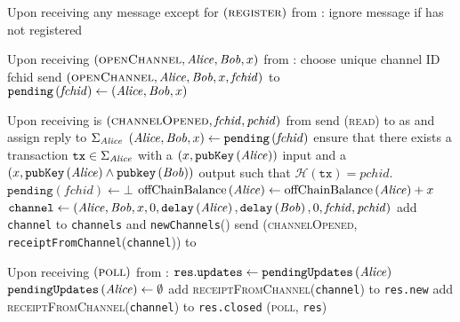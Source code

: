 \begin{functionality}{\fpaynet}
\begin{algorithmic}[1]
    \State Upon receiving any message except for
    $\left(\textsc{register}\right)$ from \alice:
    \Indent
      \State ignore message if \alice has not registered
    \EndIndent
    \State

    \State Upon receiving $\left(\textsc{openChannel}, \mathit{Alice}, \mathit{Bob}, x\right)$
    from \alice:
    \Indent
      \State choose unique channel ID fchid
      \State send $\left(\textsc{openChannel}, \mathit{Alice}, \mathit{Bob}, x,
      \mathit{fchid}\right)$ to \simulator
      \State $\mathtt{pending}\left(\mathit{fchid}\right) \gets \left(\mathit{Alice},
      \mathit{Bob}, x\right)$
    \EndIndent
    \State

    \State Upon receiving is $\left(\textsc{channelOpened}, \mathit{fchid},
    \mathit{pchid}\right)$ from \simulator
    \Indent
      \State send (\textsc{read}) to \ledger{} as \alice{} and assign reply to
      $\Sigma_{\mathit{Alice}}$
      \State $\left(\mathit{Alice}, \mathit{Bob}, x\right) \gets
      \mathtt{pending}\left(\mathit{fchid}\right)$
      \State ensure that there exists a transaction $\mathtt{tx} \in
      \Sigma_{\mathit{Alice}}$ with a $\left(x,
      \mathtt{pubKey}\left(\mathit{Alice}\right)\right)$ input and a $\left(x,
      \mathtt{pubKey}\left(\mathit{Alice}\right) \wedge
      \mathtt{pubkey}\left(\mathit{Bob}\right)\right)$ output such that
      $\mathcal{H}\left(\mathtt{tx}\right) = \mathit{pchid}$. 
      \State $\mathtt{pending}\left(\mathit{fchid}\right) \gets \bot$
      \State $\mathrm{offChainBalance}\left(\mathit{Alice}\right) \gets
      \mathrm{offChainBalance}\left(\mathit{Alice}\right) + x$ 
      \State $\mathtt{channel} \gets \left(\mathit{Alice}, \mathit{Bob}, x, 0,
      \mathtt{delay}\left(\mathit{Alice}\right), \mathtt{delay}\left(\mathit{Bob}\right), 0,
      \mathit{fchid}, \mathit{pchid}\right)$
      \State add \texttt{channel} to \texttt{channels} and
      \texttt{newChannels}(\bob)
      \State send (\textsc{channelOpened},
      \texttt{receiptFromChannel}(\texttt{channel})) to \alice
    \EndIndent
    \State

    \State Upon receiving $\left(\textsc{poll}\right)$ from \alice:
    \Indent
      \State {}
      \State {} 
      \State $\mathtt{res.updates} \gets
      \mathtt{pendingUpdates}\left(\mathit{Alice}\right)$
      \State $\mathtt{pendingUpdates}\left(\mathit{Alice}\right) \gets \emptyset$
        \State add \textsc{receiptFromChannel}(\texttt{channel}) to
        \texttt{res.new}
      \EndFor
        \State add \textsc{receiptFromChannel}(\texttt{channel}) to
        \texttt{res.closed}
      \EndFor
      \State \Return (\textsc{poll}, \texttt{res}) \alice
    \EndIndent
    \State


\end{algorithmic}
\end{functionality}
